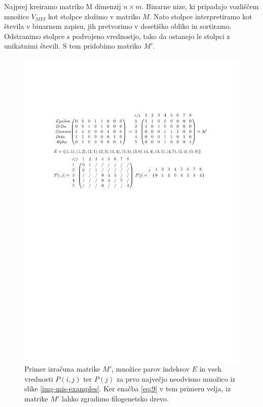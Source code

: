 \documentclass[a4paper, 12pt]{book}
\begin{document}
Najprej kreiramo matriko M dimenzij $n×m$. Binarne nize, ki pripadajo vozliščem množice $V_{MIS}$ kot stolpce zložimo v matriko $M$. Nato stolpce interpretiramo kot števila v binarnem zapisu, jih pretvorimo v desetiško obliko in sortiramo. Odstranimo stolpce s podvojeno vrednostjo, tako da ostanejo le stolpci z unikatnimi števili. S tem pridobimo matriko $M'$.

\begin{figure}
	\begin{center}
		\includegraphics[scale=0.8, clip=true, trim=2.9cm 17cm 3cm 5cm]{gfx/tree_reconstruction_m.pdf}
	\end{center}
	\caption{Primer izračuna matrike $M'$, množice parov indeksov $E$ in vseh vrednosti $P(i, j)$ ter $P(j)$ za prvo največjo neodvisno množico iz slike \ref{img-mis-examples}. Ker enačba \ref{eq:9} v tem primeru velja, iz matrike $M'$ lahko zgradimo filogenetsko drevo.}
	\label{img-reconstruct-m}
\end{figure}
\end{document}
